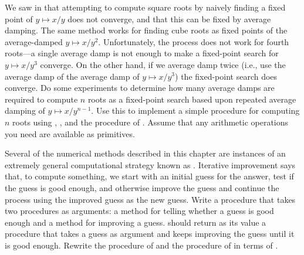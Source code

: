 \begin{exercise}
	\label{Exercise 1.45}
	We saw in  that attempting to compute square roots by naively finding a fixed point of \( y \mapsto x / y \) does not converge, and that this can be fixed by average damping.
	The same method works for finding cube roots as fixed points of the average-damped \( y \mapsto x / y^2 \).
	Unfortunately, the process does not work for fourth roots---a single average damp is not enough to make a fixed-point search for \( y \mapsto x / y^3 \) converge.
	On the other hand, if we average damp twice (i.e., use the average damp of the average damp of \( y \mapsto x / y^3 \)) the fixed-point search does converge.
	Do some experiments to determine how many average damps are required to compute \( n \) roots as a fixed-point search based upon repeated average damping of \( y \mapsto x / y^{n - 1} \).
	Use this to implement a simple procedure for computing \( n \) roots using , , and the  procedure of .
	Assume that any arithmetic operations you need are available as primitives.
\end{exercise}



\begin{exercise}
	\label{Exercise 1.46}
	Several of the numerical methods described in this chapter are instances of an extremely general computational strategy known as .
	Iterative improvement says that, to compute something, we start with an initial guess for the answer, test if the guess is good enough, and otherwise improve the guess and continue the process using the improved guess as the new guess.
	Write a procedure  that takes two procedures as arguments:
	a method for telling whether a guess is good enough and a method for improving a guess.
	 should return as its value a procedure that takes a guess as argument and keeps improving the guess until it is good enough.
	Rewrite the  procedure of  and the  procedure of  in terms of .
\end{exercise}

